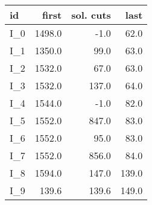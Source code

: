 \begin{tabular}{lrrr}
\toprule
   id &  first &  sol. cuts &  last \\
\midrule
 I\_0 & 1498.0 &       -1.0 &  62.0 \\
 I\_1 & 1350.0 &       99.0 &  63.0 \\
 I\_2 & 1532.0 &       67.0 &  63.0 \\
 I\_3 & 1532.0 &      137.0 &  64.0 \\
 I\_4 & 1544.0 &       -1.0 &  82.0 \\
 I\_5 & 1552.0 &      847.0 &  83.0 \\
 I\_6 & 1552.0 &       95.0 &  83.0 \\
 I\_7 & 1552.0 &      856.0 &  84.0 \\
 I\_8 & 1594.0 &      147.0 & 139.0 \\
 I\_9 &  139.6 &      139.6 & 149.0 \\
\bottomrule
\end{tabular}

